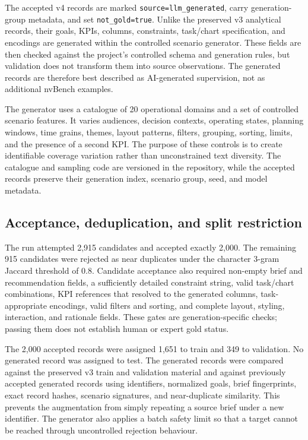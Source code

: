 The accepted v4 records are marked \texttt{source=llm\_generated}, carry generation-group metadata, and set \texttt{not\_gold=true}. Unlike the preserved v3 analytical records, their goals, KPIs, columns, constraints, task/chart specification, and encodings are generated within the controlled scenario generator. These fields are then checked against the project's controlled schema and generation rules, but validation does not transform them into source observations. The generated records are therefore best described as AI-generated supervision, not as additional nvBench examples.

The generator uses a catalogue of 20 operational domains and a set of controlled scenario features. It varies audiences, decision contexts, operating states, planning windows, time grains, themes, layout patterns, filters, grouping, sorting, limits, and the presence of a second KPI. The purpose of these controls is to create identifiable coverage variation rather than unconstrained text diversity. The catalogue and sampling code are versioned in the repository, while the accepted records preserve their generation index, scenario group, seed, and model metadata.

\subsection{Acceptance, deduplication, and split restriction}

The run attempted 2,915 candidates and accepted exactly 2,000. The remaining 915 candidates were rejected as near duplicates under the character 3-gram Jaccard threshold of 0.8. Candidate acceptance also required non-empty brief and recommendation fields, a sufficiently detailed constraint string, valid task/chart combinations, KPI references that resolved to the generated columns, task-appropriate encodings, valid filters and sorting, and complete layout, styling, interaction, and rationale fields. These gates are generation-specific checks; passing them does not establish human or expert gold status.

The 2,000 accepted records were assigned 1,651 to train and 349 to validation. No generated record was assigned to test. The generated records were compared against the preserved v3 train and validation material and against previously accepted generated records using identifiers, normalized goals, brief fingerprints, exact record hashes, scenario signatures, and near-duplicate similarity. This prevents the augmentation from simply repeating a source brief under a new identifier. The generator also applies a batch safety limit so that a target cannot be reached through uncontrolled rejection behaviour.

